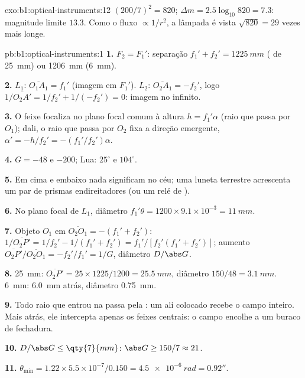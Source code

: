\begin{solution}{exo:b1:optical-instruments:12}
$(200/7)^2 = 820$; $\Delta m = 2.5\log_{10}820 = 7.3$: magnitude
limite $13.3$. Como o fluxo $\propto 1/r^2$, a lâmpada é vista
$\sqrt{820} = 29$ vezes mais longe.
\end{solution}

\begin{solution}{pb:b1:optical-instruments:1}
\textbf{1.} $F_2 = F_1'$: separação $f_1' + f_2' = \qty{1225}{mm}$
( de \qty{25}{mm}) ou \qty{1206}{mm} (\qty{6}{mm}).

\textbf{2.} $L_1$: $\overline{O_1A_1} = f_1'$ (imagem em $F_1'$). $L_2$:
$\overline{O_2A_1} = -f_2'$, logo $1/\overline{O_2A'} = 1/f_2' + 1/(-f_2')
= 0$: imagem no infinito.

\textbf{3.} O feixe focaliza no plano focal comum à altura $h =
f_1'\alpha$ (raio que passa por $O_1$); dali, o raio que passa por $O_2$ fixa
a direção emergente, $\alpha' = -h/f_2' = -(f_1'/f_2')\alpha$.

\textbf{4.} $G = -48$ e $-200$; Lua: $25^\circ$ e $104^\circ$.

\textbf{5.} Em cima e embaixo nada significam no céu; uma luneta terrestre
acrescenta um par de prismas endireitadores (ou um relé de ).

\textbf{6.} No plano focal de $L_1$, diâmetro $f_1'\theta = 1200 \times
9.1\times10^{-3} = \qty{11}{mm}$.

\textbf{7.} Objeto $O_1$ em $\overline{O_2O_1} = -(f_1' + f_2')$:
$1/\overline{O_2P'} = 1/f_2' - 1/(f_1' + f_2') = f_1'/[f_2'(f_1' + f_2')]$;
aumento $\overline{O_2P'}/\overline{O_2O_1} = -f_2'/f_1' = 1/G$,
diâmetro $D/\abs G$.

\textbf{8.} \qty{25}{mm}: $\overline{O_2P'} = 25 \times 1225/1200 =
\qty{25.5}{mm}$, diâmetro $150/48 = \qty{3.1}{mm}$. \qty{6}{mm}:
\qty{6.0}{mm} atrás, diâmetro \qty{0.75}{mm}.

\textbf{9.} Todo raio que entrou na  passa pela : um  ali colocado recebe o campo inteiro. Mais atrás, ele
intercepta apenas os feixes centrais: o campo encolhe a um buraco de fechadura.

\textbf{10.} $D/\abs G \leq \qty{7}{mm}$: $\abs G \geq 150/7 \approx 21$.

\textbf{11.} $\theta_{\min} = 1.22 \times 5.5\times10^{-7}/0.150 =
\qty{4.5e-6}{rad} = 0.92''$.


\end{solution}
